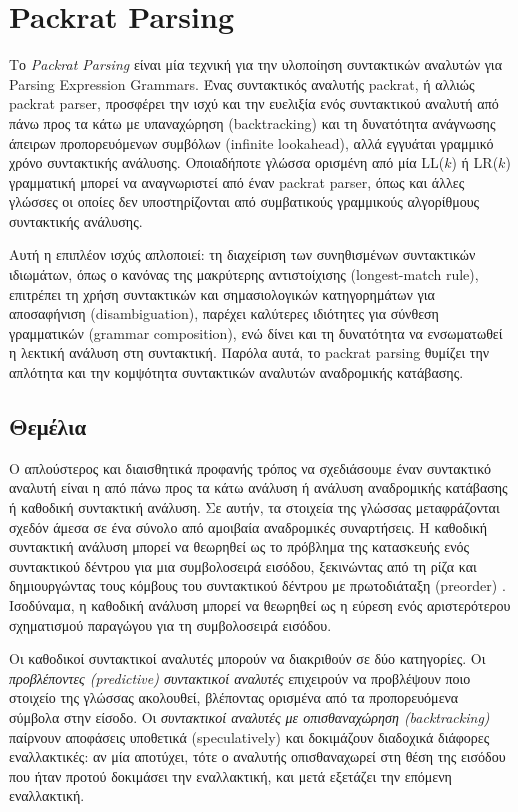 \chapter{ Packrat Parsing }
\label{ch:packrat}

Το \textit{Packrat Parsing} \cite{Ford2002a} είναι μία τεχνική για την υλοποίηση συντακτικών αναλυτών για Parsing Expression Grammars.
Ένας συντακτικός αναλυτής packrat, ή αλλιώς packrat parser, προσφέρει την ισχύ και την ευελιξία ενός συντακτικού αναλυτή από πάνω προς τα κάτω με υπαναχώρηση (backtracking) και τη δυνατότητα ανάγνωσης άπειρων προπορευόμενων συμβόλων (infinite lookahead), αλλά εγγυάται γραμμικό χρόνο συντακτικής ανάλυσης.
Οποιαδήποτε γλώσσα ορισμένη από μία LL($k$) ή LR($k$) γραμματική μπορεί να αναγνωριστεί από έναν packrat parser, όπως και άλλες γλώσσες οι οποίες δεν υποστηρίζονται από συμβατικούς γραμμικούς αλγορίθμους συντακτικής ανάλυσης.

Αυτή η επιπλέον ισχύς απλοποιεί: τη διαχείριση των συνηθισμένων συντακτικών ιδιωμάτων, όπως ο κανόνας της μακρύτερης αντιστοίχισης (longest-match rule), επιτρέπει τη χρήση συντακτικών και σημασιολογικών κατηγορημάτων για αποσαφήνιση (disambiguation), παρέχει καλύτερες ιδιότητες για σύνθεση γραμματικών (grammar composition), ενώ δίνει και τη δυνατότητα να ενσωματωθεί η λεκτική ανάλυση στη συντακτική.
Παρόλα αυτά, το packrat parsing θυμίζει την απλότητα και την κομψότητα συντακτικών αναλυτών αναδρομικής κατάβασης.

\section{Θεμέλια}

Ο απλούστερος και διαισθητικά προφανής τρόπος να σχεδιάσουμε έναν συντακτικό αναλυτή είναι η από πάνω προς τα κάτω ανάλυση ή ανάλυση αναδρομικής κατάβασης ή καθοδική συντακτική ανάλυση.
Σε αυτήν, τα στοιχεία της γλώσσας μεταφράζονται σχεδόν άμεσα σε ένα σύνολο από αμοιβαία αναδρομικές συναρτήσεις.
Η καθοδική συντακτική ανάλυση μπορεί να θεωρηθεί ως το πρόβλημα της κατασκευής ενός συντακτικού δέντρου για μια συμβολοσειρά εισόδου, ξεκινώντας από τη ρίζα και δημιουργώντας τους κόμβους του συντακτικού δέντρου με πρωτοδιάταξη (preorder) \cite{Aho2006}. Ισοδύναμα, η καθοδική ανάλυση μπορεί να θεωρηθεί ως η εύρεση ενός αριστερότερου σχηματισμού παραγώγου για τη συμβολοσειρά εισόδου.

Οι καθοδικοί συντακτικοί αναλυτές μπορούν να διακριθούν σε δύο κατηγορίες. Οι \textit{προβλέποντες (predictive) συντακτικοί αναλυτές} επιχειρούν να προβλέψουν ποιο στοιχείο της γλώσσας ακολουθεί, βλέποντας ορισμένα από τα προπορευόμενα σύμβολα στην είσοδο.
Οι \textit{συντακτικοί αναλυτές με οπισθαναχώρηση (backtracking)} παίρνουν αποφάσεις υποθετικά (speculatively) και δοκιμάζουν διαδοχικά διάφορες εναλλακτικές: αν μία αποτύχει, τότε ο αναλυτής οπισθαναχωρεί στη θέση της εισόδου που ήταν προτού δοκιμάσει την εναλλακτική, και μετά εξετάζει την επόμενη εναλλακτική. 

